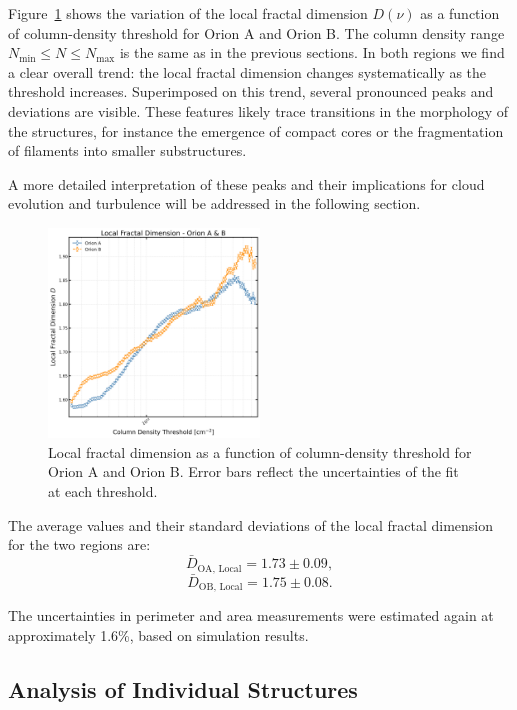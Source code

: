 Figure~\ref{fig:local_Orion_A_B} shows the variation of the local fractal dimension $D(\nu)$ as a function of column-density threshold for Orion A and Orion B. The column density range  \(N_\mathrm{min} \leq N \leq N_\mathrm{max}\) is the same as in the previous sections. In both regions we find a clear overall trend: the local fractal dimension changes systematically as the threshold increases. Superimposed on this trend, several pronounced peaks and deviations are visible. These features likely trace transitions in the morphology of the structures, for instance the emergence of compact cores or the fragmentation of filaments into smaller substructures.

A more detailed interpretation of these peaks and their implications for cloud evolution and turbulence will be addressed in the following section.

\begin{figure}[t]
    \centering
    \includegraphics[width=0.5\textwidth]{figures/local_orion_A_B.png}
    \caption{Local fractal dimension as a function of column-density threshold for Orion A and Orion B. Error bars reflect the uncertainties of the fit at each threshold.}
    \label{fig:local_Orion_A_B}
\end{figure}

The average values and their standard deviations of the local fractal dimension for the two regions are:
\[
\bar{D}_{\mathrm{OA,\,Local}} = 1.73 \pm 0.09,
\]
\[
\bar{D}_{\mathrm{OB,\,Local}} = 1.75 \pm 0.08.
\]

The uncertainties in perimeter and area measurements were estimated again at approximately 1.6\%, based on simulation results.

\subsection{Analysis of Individual Structures}

